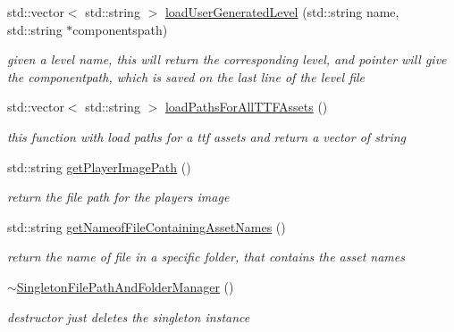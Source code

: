 \begin{DoxyCompactItemize}
std\+::vector$<$ std\+::string $>$ \hyperlink{class_singleton_file_path_and_folder_manager_a2f44faea6179c30dbb646ffcf9de1407}{load\+User\+Generated\+Level} (std\+::string name, std\+::string $\ast$componentspath)
\begin{DoxyCompactList}\small\item\em given a level name, this will return the corresponding level, and pointer will give the componentpath, which is saved on the last line of the level file \end{DoxyCompactList}\item 
\hypertarget{class_singleton_file_path_and_folder_manager_ac8b651b9e78abe3415a1e73da499cc8b}{}\label{class_singleton_file_path_and_folder_manager_ac8b651b9e78abe3415a1e73da499cc8b} 
std\+::vector$<$ std\+::string $>$ \hyperlink{class_singleton_file_path_and_folder_manager_ac8b651b9e78abe3415a1e73da499cc8b}{load\+Paths\+For\+All\+T\+T\+F\+Assets} ()
\begin{DoxyCompactList}\small\item\em this function with load paths for a ttf assets and return a vector of string \end{DoxyCompactList}\item 
\hypertarget{class_singleton_file_path_and_folder_manager_a705faf950dc9449c2e9554ae8b0cf98c}{}\label{class_singleton_file_path_and_folder_manager_a705faf950dc9449c2e9554ae8b0cf98c} 
std\+::string \hyperlink{class_singleton_file_path_and_folder_manager_a705faf950dc9449c2e9554ae8b0cf98c}{get\+Player\+Image\+Path} ()
\begin{DoxyCompactList}\small\item\em return the file path for the players image \end{DoxyCompactList}\item 
\hypertarget{class_singleton_file_path_and_folder_manager_a92e3f0074b0c3e35356ea53f3cf09234}{}\label{class_singleton_file_path_and_folder_manager_a92e3f0074b0c3e35356ea53f3cf09234} 
std\+::string \hyperlink{class_singleton_file_path_and_folder_manager_a92e3f0074b0c3e35356ea53f3cf09234}{get\+Nameof\+File\+Containing\+Asset\+Names} ()
\begin{DoxyCompactList}\small\item\em return the name of file in a specific folder, that contains the asset names \end{DoxyCompactList}\item 
\hypertarget{class_singleton_file_path_and_folder_manager_a0c8f7a1e563fbcef1516812644740475}{}\label{class_singleton_file_path_and_folder_manager_a0c8f7a1e563fbcef1516812644740475} 
\hyperlink{class_singleton_file_path_and_folder_manager_a0c8f7a1e563fbcef1516812644740475}{$\sim$\+Singleton\+File\+Path\+And\+Folder\+Manager} ()
\begin{DoxyCompactList}\small\item\em destructor just deletes the singleton instance \end{DoxyCompactList}\end{DoxyCompactItemize}
